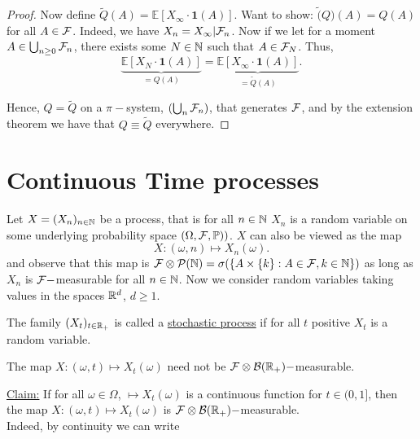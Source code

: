 \documentclass{article}
\begin{document}
\begin{proof}
Now define $ \tilde{Q}(A) = \mathbb{E}\left[ X_{\infty}\cdot \mathbf{1}(A) \right]
$. Want to show: $ \tilde(Q)(A) = Q(A)$ for all $ A\in \mathcal{F}$. Indeed, we have $ X_{n} = X_{\infty}|\mathcal{F}_{n}$. Now if we let for a moment $ A \in \bigcup_{n\geq 0}\mathcal{F}_{n} $, there exists some $ N\in \mathbb{N}$ such that $ A\in \mathcal{F}_{N}$. Thus, 
\[
	\displaystyle\underbrace{\mathbb{E}\left[ X_{N}\cdot \mathbf{1}(A) \right] }_{= Q(A)} =\displaystyle\underbrace{\mathbb{E}\left[ X_{\infty}\cdot \mathbf{1}(A) \right] }_{=\tilde{Q}(A)}.
\]

Hence, $ Q = \tilde{Q}$ on a $\pi-$system, $ \left( \bigcup_{n} \mathcal{F}_{n} \right)$, that generates $ \mathcal{F}$, and by the extension theorem we have that $ Q \equiv \tilde{Q}$ everywhere.
\end{proof}

\section{Continuous Time processes}\label{sec: cont time processes}
Let $X  =(X_{n})_{n\in \mathbb{N}} $ be a process, that is for all $ n\in \mathbb{N}$ $ X_{n}$ is a random variable on some underlying probability space $ (\Omega, \mathcal{F} ,\mathbb{P}))$. $ X$ can also be viewed as the map
\[
X:(\omega,n)\mapsto X_{n}(\omega).
\]
and observe that this map is $ \mathcal{F}\otimes \mathcal{P}(\mathbb{N}) = \sigma(\{A\times \{k\}: A\in \mathcal{F}, k\in \mathbb{N}\})$ as long as $ X_{n}$ is $ \mathcal{F}-$measurable for all $ n\in \mathbb{N}$. Now we consider random variables taking values in the spaces $ \mathbb{R}^{d}$, $ d\geq 1$. \\ 

\begin{boxdef}\label{def: stoch proces}
	The family $ (X_{t})_{t\in \mathbb{R}_{+}}$ is called a \underline{stochastic process} if for all $ t$ positive $ X_{t}$ is a random variable.
\end{boxdef}


\begin{remark}
    The map $ X:(\omega, t)\mapsto X_{t}(\omega)$ need not be $ \mathcal{F}\otimes  \mathcal{B}(\mathbb{R}_{+})-$measurable. 
\end{remark}

\underline{Claim:} If for all $ \omega \in \Omega$, $ \mapsto X_{t}(\omega)$ is a continuous function for $ t\in(0,1]$, then the map $ X:(\omega, t)\mapsto X_{t}(\omega)$ is $ \mathcal{F}\otimes  \mathcal{B}(\mathbb{R}_{+})-$measurable. \\ 

Indeed, by continuity we can write 
\end{document}
